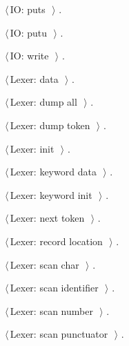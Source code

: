 \documentclass[11pt,a4paper,twoside,openright,DIV=15]{scrbook}
\theoremstyle{definition}
\theoremstyle{plain}
\theoremstyle{remark}
\begin{document}
{\begin{list}{}{\setlength{\itemsep}{-\parsep}\setlength{\itemindent}{-\leftmargin}}
\item $\langle\,$IO: puts\nobreak\ {\footnotesize {}}$\,\rangle$ {\footnotesize {\NWtxtRefIn} .}
\item $\langle\,$IO: putu\nobreak\ {\footnotesize {}}$\,\rangle$ {\footnotesize {\NWtxtRefIn} .}
\item $\langle\,$IO: write\nobreak\ {\footnotesize {}}$\,\rangle$ {\footnotesize {\NWtxtRefIn} .}
\item $\langle\,$Lexer: data\nobreak\ {\footnotesize {}}$\,\rangle$ {\footnotesize {\NWtxtRefIn} .}
\item $\langle\,$Lexer: dump all\nobreak\ {\footnotesize {}}$\,\rangle$ {\footnotesize {\NWtxtRefIn} .}
\item $\langle\,$Lexer: dump token\nobreak\ {\footnotesize {}}$\,\rangle$ {\footnotesize {\NWtxtRefIn} .}
\item $\langle\,$Lexer: init\nobreak\ {\footnotesize {}}$\,\rangle$ {\footnotesize {\NWtxtRefIn} .}
\item $\langle\,$Lexer: keyword data\nobreak\ {\footnotesize {}}$\,\rangle$ {\footnotesize {\NWtxtRefIn} .}
\item $\langle\,$Lexer: keyword init\nobreak\ {\footnotesize {}}$\,\rangle$ {\footnotesize {\NWtxtRefIn} .}
\item $\langle\,$Lexer: next token\nobreak\ {\footnotesize {}}$\,\rangle$ {\footnotesize {\NWtxtRefIn} .}
\item $\langle\,$Lexer: record location\nobreak\ {\footnotesize {}}$\,\rangle$ {\footnotesize {\NWtxtRefIn} .}
\item $\langle\,$Lexer: scan char\nobreak\ {\footnotesize {}}$\,\rangle$ {\footnotesize {\NWtxtRefIn} .}
\item $\langle\,$Lexer: scan identifier\nobreak\ {\footnotesize {}}$\,\rangle$ {\footnotesize {\NWtxtRefIn} .}
\item $\langle\,$Lexer: scan number\nobreak\ {\footnotesize {}}$\,\rangle$ {\footnotesize {\NWtxtRefIn} .}
\item $\langle\,$Lexer: scan punctuator\nobreak\ {\footnotesize {}}$\,\rangle$ {\footnotesize {\NWtxtRefIn} .}

\end{list}}
\end{document}
